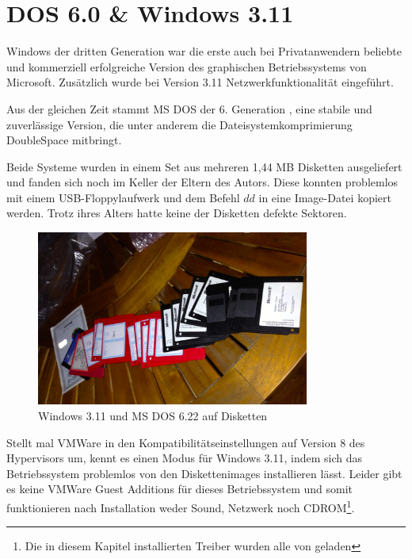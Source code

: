 \newpage

\section{DOS 6.0 \& Windows 3.11}
	Windows der dritten Generation war die erste auch bei Privatanwendern beliebte und kommerziell erfolgreiche Version des graphischen Betriebssystems von Microsoft.
	Zusätzlich wurde bei Version 3.11 Netzwerkfunktionalität eingeführt.

	Aus der gleichen Zeit stammt MS DOS der 6. Generation \cite{WinHistory}, eine stabile und zuverlässige Version, die unter anderem die Dateisystemkomprimierung DoubleSpace mitbringt.

	Beide Systeme wurden in einem Set aus mehreren 1,44 MB Disketten ausgeliefert und fanden sich noch im Keller der Eltern des Autors.
	Diese konnten problemlos mit einem USB-Floppylaufwerk und dem Befehl $dd$ in eine Image-Datei kopiert werden.
	Trotz ihres Alters hatte keine der Disketten defekte Sektoren.

		\begin{figure}[h]
		\begin{center}
			\includegraphics[width=0.8\textwidth]{img/win311disks.jpg}
			\caption{Windows 3.11 und MS DOS 6.22 auf Disketten}
			\label{fig:screenshot-win311disks}
		\end{center}
	\end{figure}

	Stellt mal VMWare in den Kompatibilitätseinstellungen auf Version 8 des Hypervisors um, kennt es einen Modus für Windows 3.11, indem sich das Betriebssystem problemlos von den Diskettenimages installieren lässt. Leider gibt es keine VMWare Guest Additions für dieses Betriebssystem und somit funktionieren nach Installation weder Sound, Netzwerk noch CDROM\footnote{Die in diesem Kapitel installierten Treiber wurden alle von \cite{VMDriver} geladen}.

